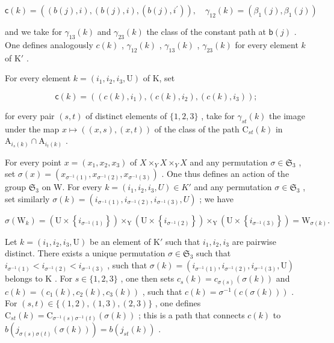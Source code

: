 \[
\mathsf {c} (k) = ((b (j), i), (b (j), i), (b (j), i ^ {\prime})), \quad \gamma_ {1 2} (k) = (\beta_ {1} (j), \beta_ {1} (j))
\]

and we take for \(\gamma_{13}(k)\) and \(\gamma_{23}(k)\) the class of the constant path at \(\mathsf{b}(j)\) . One defines analogously \(c(k)\) , \(\gamma_{12}(k)\) , \(\gamma_{13}(k)\) , \(\gamma_{23}(k)\) for every element \(k\) of \(\mathrm{K}'\) .

For every element \(k = (i_{1}, i_{2}, i_{3}, \mathrm{U})\) of K, set

\[
\mathsf {c} (k) = ((c (k), i _ {1}), (c (k), i _ {2}), (c (k), i _ {3})) ;
\]

for every pair \((s,t)\) of distinct elements of \(\{1,2,3\}\) , take for \(\gamma_{st}(k)\) the image under the map \(x\mapsto((x,s),(x,t))\) of the class of the path \(\mathrm{C}_{st}(k)\) in \(\mathrm{A}_{i_{s}(k)}\cap\mathrm{A}_{i_{t}(k)}\) .

For every point \(x = (x_1, x_2, x_3)\) of \(X \times_Y X \times_Y X\) and any permutation \(\sigma \in \mathfrak{S}_3\) , set \(\sigma(x) = (x_{\sigma^{-1}(1)}, x_{\sigma^{-1}(2)}, x_{\sigma^{-1}(3)})\) . One thus defines an action of the group \(\mathfrak{S}_3\) on W. For every \(k = (i_1, i_2, i_3, U) \in K'\) and any permutation \(\sigma \in \mathfrak{S}_3\) , set similarly \(\sigma(k) = (i_{\sigma^{-1}(1)}, i_{\sigma^{-1}(2)}, i_{\sigma^{-1}(3)}, U)\) ; we have

\[
\sigma \left(\mathrm{W} _ {k}\right) = \left(\mathrm{U} \times \left\{i _ {\sigma^ {- 1} (1)} \right\}\right) \times_ {\mathrm{Y}} \left(\mathrm{U} \times \left\{i _ {\sigma^ {- 1} (2)} \right\}\right) \times_ {\mathrm{Y}} \left(\mathrm{U} \times \left\{i _ {\sigma^ {- 1} (3)} \right\}\right) = \mathrm{W} _ {\sigma (k)}.
\]

Let \(k = (i_1, i_2, i_3, \mathrm{U})\) be an element of \(\mathrm{K}'\) such that \(i_1, i_2, i_3\) are pairwise distinct. There exists a unique permutation \(\sigma \in \mathfrak{S}_3\) such that \(i_{\sigma^{-1}(1)} < i_{\sigma^{-1}(2)} < i_{\sigma^{-1}(3)}\) , such that \(\sigma(k) = (i_{\sigma^{-1}(1)}, i_{\sigma^{-1}(2)}, i_{\sigma^{-1}(3)}, \mathrm{U})\) belongs to \(\mathrm{K}\) . For \(s \in \{1, 2, 3\}\) , one then sets \(c_s(k) = c_{\sigma(s)}(\sigma(k))\) and \(c(k) = (c_1(k), c_2(k), c_3(k))\) , such that \(c(k) = \sigma^{-1}(c(\sigma(k)))\) . For \((s, t) \in \{(1, 2), (1, 3), (2, 3)\}\) , one defines \(\mathrm{C}_{st}(k) = \mathrm{C}_{\sigma^{-1}(s)\sigma^{-1}(t)}(\sigma(k))\) ; this is a path that connects \(c(k)\) to \(b(j_{\sigma(s)\sigma(t)}(\sigma(k))) = b(j_{st}(k))\) .

